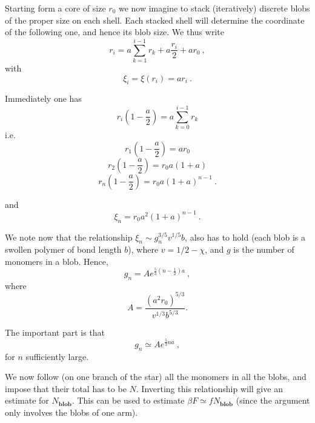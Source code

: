 \documentclass[
preprint,
a4paper,
12pt,
superscriptaddress,
pre]{revtex4}
\begin{document}
Starting form a core of size $r_0$ we now imagine to stack
(iteratively) discrete blobs of the proper size on each shell. Each
stacked shell will determine the coordinate of the following one, and
hence its blob size. We thus write
\begin{displaymath}
  r_i = a \sum_{k=1}^{i-1} r_k + a \frac{r_i}{2} + a r_0 \ ,  
\end{displaymath}
with
\begin{displaymath}
  \xi_i = \xi(r_i) = a r_i \ .
\end{displaymath}

Immediately one has 
\begin{displaymath}
  r_i \left(1 -\frac{a}{2} \right) = a \sum_{k=0}^{i-1} r_k
\end{displaymath}
i.e. 
\begin{displaymath}
  r_1 \left(1 -\frac{a}{2} \right) = a r_0
\end{displaymath}
\begin{displaymath}
  r_2 \left(1 -\frac{a}{2} \right) = r_0 a(1+a)
\end{displaymath}
\begin{displaymath}
  r_n \left(1 -\frac{a}{2} \right) = r_0 a (1+a)^{n-1} \ .
\end{displaymath}

and
\begin{displaymath}
  \xi_n = r_0 a^2 (1+a)^{n-1} \ .
\end{displaymath}

We note now that the relationship $\xi_n \sim g_n^{3/5} v^{1/5} b$,
also has to hold (each blob is a swollen polymer of bond length $b$),
where $v=1/2 - \chi$, and $g$ is the number of monomers in a
blob. Hence,
\begin{displaymath}
  g_n = A e^{\frac{5}{3}\left(n-\frac{1}{2}\right)a} \ ,  
\end{displaymath}
where
\begin{displaymath}
 A= \frac{(a^2 r_0)^{5/3}}{v^{1/3} b^{5/3}} . 
\end{displaymath}

The important part is that  
\begin{displaymath}
  g_n \simeq A e^{\frac{5}{3}n a} \ ,  
\end{displaymath}
for $n$ sufficiently large.

We now follow (on one branch of the star) all the monomers in all the
blobs, and impose that their total has to be $N$. Inverting this
relationship will give an estimate for $N_{\mathbf{blob}}$. This can
be used to estimate $\beta F \simeq f N_{\mathbf{blob}}$ (since the
argument only involves the blobs of one arm).
\end{document}
